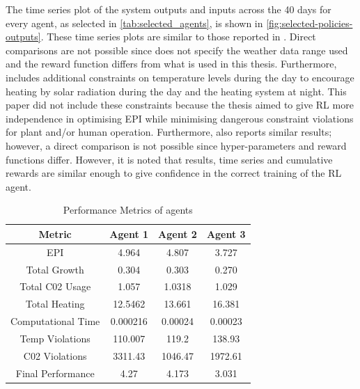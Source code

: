 The time series plot of the system outputs and inputs across the 40 days for every agent, as selected in \autoref{tab:selected_agents}, is shown in \autoref{fig:selected-policies-outputs}. These time series plots are similar to those reported in \citet{jansenOptimalControlLettuce2023,morcegoReinforcementLearningModel2023}. Direct comparisons are not possible since \citet{morcegoReinforcementLearningModel2023} does not specify the weather data range used and the reward function differs from what is used in this thesis. Furthermore, \citet{morcegoReinforcementLearningModel2023} includes additional constraints on temperature levels during the day to encourage heating by solar radiation during the day and the heating system at night. This paper did not include these constraints because the thesis aimed to give RL more independence in optimising EPI while minimising dangerous constraint violations for plant and/or human operation. Furthermore, \citet{jansenOptimalControlLettuce2023} also reports similar results; however, a direct comparison is not possible since hyper-parameters and reward functions differ. However, it is noted that results, time series and cumulative rewards are similar enough to give confidence in the correct training of the RL agent.
\begin{table}[H]
    \centering
    \begin{tabular}{|c|c|c|c|}
    \hline
         Metric& Agent 1 & Agent 2 & Agent 3  \\
         \hline
         EPI                &4.964      & 4.807     &3.727 \\
         Total Growth       &0.304      &0.303      &0.270 \\
         Total C02 Usage    &1.057      &1.0318     &1.029 \\
         Total Heating      &12.5462    &13.661     &16.381 \\
         Computational Time &0.000216   &0.00024    &0.00023 \\
         Temp Violations    &110.007    &119.2      &138.93 \\
         C02 Violations     &3311.43    &1046.47    &1972.61 \\
          Final Performance &4.27       &4.173      &3.031 \\ 
         \hline
    \end{tabular}
    \caption{Performance Metrics of agents}
    \label{tab:perf-metrics-selected-policies}
\end{table}

